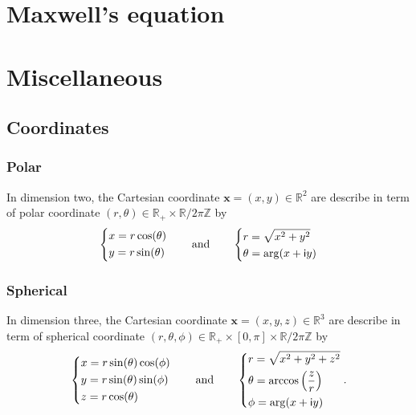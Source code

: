 \documentclass[12pt,a4paper]{article}
\theoremstyle{definition}
\theoremstyle{plain}
\theoremstyle{remark}
\newcommand{\bbR}{\mathbb{R}}
\newcommand{\bbZ}{\mathbb{Z}}
\newcommand{\im}{\mathsf{i}}
\newcommand{\plr}[1]{\left(#1\right)}
\newcommand{\vx}{\boldsymbol{x}}
\begin{document}
\section{Maxwell's equation}

\appendix

\section{Miscellaneous}

\subsection{Coordinates}

%
\subsubsection{Polar}
%

In dimension two, the Cartesian coordinate $\vx = (x, y) \in \bbR^2$ are describe in term of polar coordinate $(r, \theta) \in \bbR_+ \times \bbR / 2\pi\bbZ$ by
\[
    \begin{dcases}
        x = r \cos(\theta) \\
        y = r \sin(\theta)
    \end{dcases} \qquad
    \text{and} \qquad
    \begin{dcases}
        r = \sqrt{x^2 + y^2} \\
        \theta = \arg(x + \im y)
    \end{dcases}
\]

%
\subsubsection{Spherical}
%

In dimension three, the Cartesian coordinate $\vx = (x, y, z) \in \bbR^3$ are describe in term of spherical coordinate $(r, \theta, \phi) \in \bbR_+ \times [0, \pi] \times \bbR / 2\pi\bbZ$ by
\[
    \begin{dcases}
        x = r \sin(\theta) \cos(\phi) \\
        y = r \sin(\theta) \sin(\phi) \\
        z = r \cos(\theta)
    \end{dcases} \qquad
    \text{and} \qquad
    \begin{dcases}
        r = \sqrt{x^2 + y^2 + z^2}        \\
        \theta = \arccos\plr{\frac{z}{r}} \\
        \phi = \arg(x + \im y)
    \end{dcases}.
\]
\end{document}
